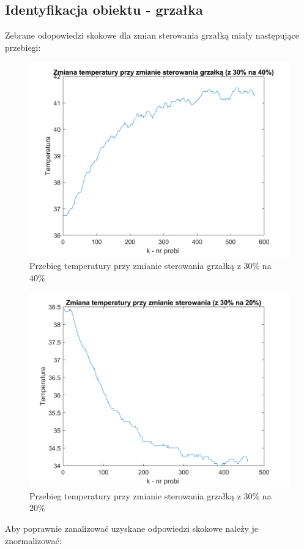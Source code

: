 \documentclass[12pt, a4paper]{article}
\begin{document}
\subsection{Identyfikacja obiektu - grzałka} \label{grzalka}
Zebrane odopowiedzi skokowe dla zmian sterowania grzałką miały następujące przebiegi:
\begin{figure}[H]
	\centering
	\includegraphics[width=0.9\linewidth]{nnor_od_skok_gg}
	\caption{Przebieg temperatury przy zmianie sterowania grzałką z $30\%$ na $40\%$}
	\label{fig:nnosgg}
\end{figure}
\begin{figure}[H]
	\centering
	\includegraphics[width=0.9\linewidth]{nnor_od_skok_gd}
	\caption{Przebieg temperatury przy zmianie sterowania grzałką z $30\%$ na $20\%$}
	\label{fig:nnosgd}
\end{figure}
Aby poprawnie zanalizować uzyskane odpowiedzi skokowe należy je znormalizować: \\
\end{document}

